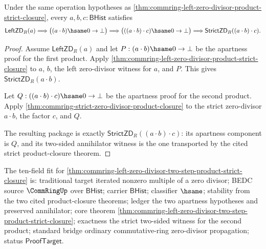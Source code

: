 \begin{theorem}
\label{thm:commring-left-zero-divisor-two-step-product-strict-closure}
Under the same operation hypotheses as
\autoref{thm:commring-left-zero-divisor-product-strict-closure}, every
$a,b,c:\mathsf{BHist}$ satisfies
$$
\mathsf{LeftZD}_R(a)
\Longrightarrow
\bigl((a\cdot b)\hsame0\to\bot\bigr)
\Longrightarrow
\bigl(((a\cdot b)\cdot c)\hsame0\to\bot\bigr)
\Longrightarrow
\mathsf{StrictZD}_R((a\cdot b)\cdot c).
$$
\end{theorem}
\begin{proof}
Assume $\mathsf{LeftZD}_R(a)$ and let
$P:(a\cdot b)\hsame0\to\bot$ be the apartness proof for the first product.
Apply \autoref{thm:commring-left-zero-divisor-product-strict-closure} to
$a$, $b$, the left zero-divisor witness for $a$, and $P$. This gives
$\mathsf{StrictZD}_R(a\cdot b)$.

Let $Q:((a\cdot b)\cdot c)\hsame0\to\bot$ be the apartness proof for the
second product. Apply
\autoref{thm:commring-strict-zero-divisor-product-closure} to the strict
zero-divisor $a\cdot b$, the factor $c$, and $Q$.

The resulting package is exactly
$\mathsf{StrictZD}_R((a\cdot b)\cdot c)$: its apartness component is $Q$, and
its two-sided annihilator witness is the one transported by the cited strict
product-closure theorem.
\end{proof}

The ten-field fit for
\autoref{thm:commring-left-zero-divisor-two-step-product-strict-closure} is:
traditional target iterated nonzero multiple of a zero divisor; BEDC source
$\CommRingUp$ over $\mathsf{BHist}$; carrier $\mathsf{BHist}$; classifier
$\hsame$; stability from the two cited product-closure theorems; ledger the two
apartness hypotheses and preserved annihilator; core theorem
\autoref{thm:commring-left-zero-divisor-two-step-product-strict-closure};
exactness the strict two-sided witness for the second product; standard bridge
ordinary commutative-ring zero-divisor propagation; status
$\mathsf{ProofTarget}$.


